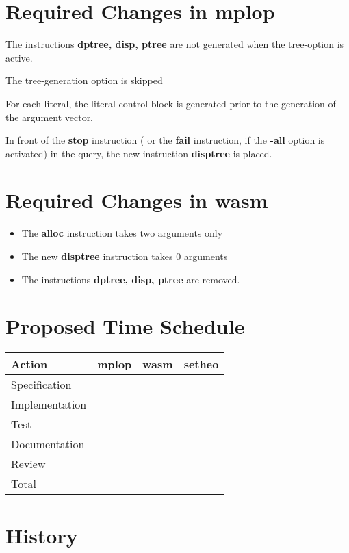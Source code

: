 \section{Required Changes in mplop}

The instructions {\bf dptree, disp, ptree} are not generated when the
tree-option is active.

The tree-generation option is skipped

For each literal, the literal-control-block is generated prior to the
generation of the argument vector.

In front of the {\bf stop} instruction ( or the {\bf fail}
instruction, if the {\bf -all} option is activated)
 in the query, the new instruction
{\bf disptree} is placed.

\section{Required Changes in wasm}

\begin{itemize}
\item The {\bf alloc} instruction takes two arguments only

\item The new {\bf disptree} instruction takes 0 arguments

\item The instructions {\bf dptree, disp, ptree} are removed.
\end{itemize}

\section{Proposed Time Schedule}

\begin{center}
\begin{tabular}{|l|r|r|r|}
\hline\hline
Action & mplop & wasm & setheo \\
\hline
Specification & & & \\
Implementation & & & \\
Test & & & \\
Documentation & & & \\
Review & & & \\
\hline
Total & & & \\
\hline\hline
\end{tabular}
\end{center}
\section{History}

